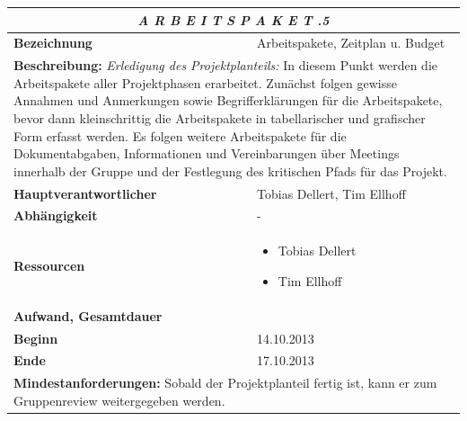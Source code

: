 \documentclass[fontsize=12pt,paper=a4,twoside]{scrartcl}
\begin{document}
\begin{tabular}{p{7.5cm}|p{7.5cm}}\toprule
\multicolumn{2}{c}{\textbf{\textit{A R B E I T S P A K E T \quad 1.1.5}}} \\ \toprule \hline
\textbf{Bezeichnung} & Arbeitspakete, Zeitplan u. Budget\\\hline
\multicolumn{2}{p{15cm}}{\textbf{Beschreibung:} \newline 
\textit{Erledigung des Projektplanteils:} In diesem Punkt werden die Arbeitspakete aller Projektphasen erarbeitet. Zunächst folgen gewisse Annahmen und Anmerkungen sowie Begrifferklärungen für die Arbeitspakete, bevor dann kleinschrittig die Arbeitspakete in tabellarischer und grafischer Form erfasst werden. Es folgen weitere Arbeitspakete für die Dokumentabgaben, Informationen und Vereinbarungen über Meetings innerhalb der Gruppe und der Festlegung des kritischen Pfads für das Projekt.}  \\\hline
\textbf{Hauptverantwortlicher} & Tobias Dellert, Tim Ellhoff \\\hline
\textbf{Abhängigkeit} & -\\\hline
\textbf{Ressourcen} & \begin{itemize}
\itemsep0pt
\item Tobias Dellert
\item Tim Ellhoff
\end{itemize} \\\hline
\textbf{Aufwand, Gesamtdauer} & \\\hline
\textbf{Beginn} & 14.10.2013 \\\hline
\textbf{Ende} & 17.10.2013\\\hline
\multicolumn{2}{p{15cm}}{\textbf{Mindestanforderungen: } \newline
Sobald der Projektplanteil fertig ist, kann er zum Gruppenreview weitergegeben werden. }  \\ \toprule
\end{tabular} \\\\
\end{document}
